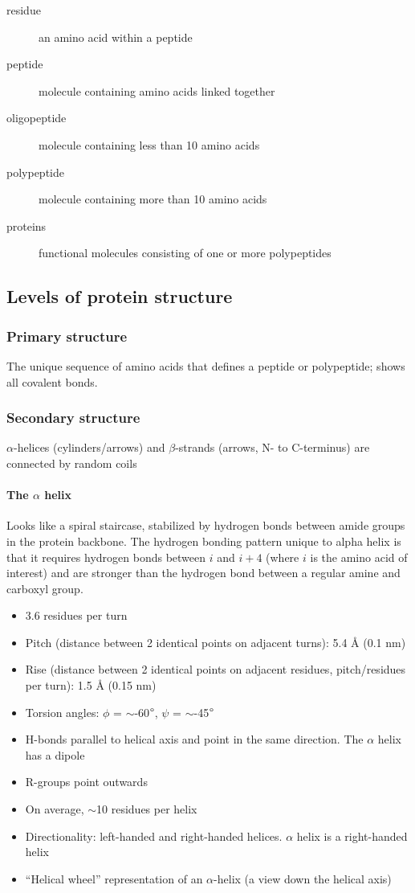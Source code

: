 \documentclass[letterpaper, 12pt]{article}
\begin{document}
\begin{description}
\item [residue] an amino acid within a peptide
\item [peptide] molecule containing amino acids linked together
\item [oligopeptide] molecule containing less than 10 amino acids
\item [polypeptide] molecule containing more than 10 amino acids
\item [proteins] functional molecules consisting of one or more polypeptides
\end{description}

\subsection*{Levels of protein structure}

\subsubsection*{Primary structure}
The unique sequence of amino acids that defines a peptide or polypeptide; shows all covalent bonds.

\subsubsection*{Secondary structure}
$\alpha$-helices (cylinders/arrows) and $\beta$-strands (arrows, N- to C-terminus) are connected by random coils

\paragraph{The $\alpha$ helix} Looks like a spiral staircase, stabilized by hydrogen bonds between amide groups in the protein backbone. The hydrogen bonding pattern unique to alpha helix is that it requires hydrogen bonds between $i$ and $i+4$ (where $i$ is the amino acid of interest) and are stronger than the hydrogen bond between a regular amine and carboxyl group.

\begin{itemize}
\item 3.6 residues per turn
\item Pitch (distance between 2 identical points on adjacent turns): 5.4 Å (0.1 nm)
\item Rise (distance between 2 identical points on adjacent residues, pitch/residues per turn): 1.5 Å (0.15 nm)
\item Torsion angles: $\phi$ = $\sim$-60$\degree$, $\psi$ = $\sim$-45$\degree$
\item H-bonds parallel to helical axis and point in the same direction. The $\alpha$ helix has a dipole
\item R-groups point outwards
\item On average, $\sim$10 residues per helix
\item Directionality: left-handed and right-handed helices. $\alpha$ helix is a right-handed helix
\item ``Helical wheel'' representation of an $\alpha$-helix (a view down the helical axis)
\end{itemize}
\end{document}
